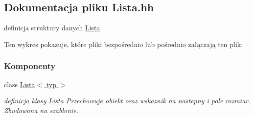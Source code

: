 \hypertarget{_lista_8hh}{}\subsection{Dokumentacja pliku Lista.\+hh}
\label{_lista_8hh}


definicja struktury danych \hyperlink{class_lista}{Lista}  


Ten wykres pokazuje, które pliki bezpośrednio lub pośrednio załączają ten plik\+:
\subsubsection*{Komponenty}
\begin{DoxyCompactItemize}
\item 
class \hyperlink{class_lista}{Lista$<$ typ $>$}
\begin{DoxyCompactList}\small\item\em definicja klasy \hyperlink{class_lista}{Lista} Przechowuje obiekt oraz wskaznik na nastepny i pole rozmiar. Zbudowana na szablonie. \end{DoxyCompactList}\end{DoxyCompactItemize}
